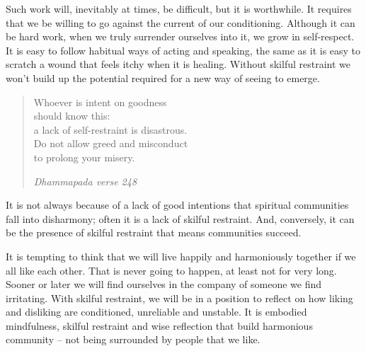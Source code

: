 Such work will, inevitably at times, be difficult, but it is worthwhile.
It requires that we be willing to go against the current of our
conditioning. Although it can be hard work, when we truly surrender
ourselves into it, we grow in self-respect. It is easy to follow
habitual ways of acting and speaking, the same as it is easy to scratch
a wound that feels itchy when it is healing. Without skilful restraint
we won't build up the potential required for a new way of seeing to
emerge.

\begin{quote}
  Whoever is intent on goodness\\
  should know this:\\
  a lack of self-restraint is disastrous.\\
  Do not allow greed and misconduct\\
  to prolong your misery.

  \emph{Dhammapada verse 248}
\end{quote}

It is not always because of a lack of good intentions that spiritual
communities fall into disharmony; often it is a lack of skilful
restraint. And, conversely, it can be the presence of skilful restraint
that means communities succeed.

It is tempting to think that we will live happily and harmoniously
together if we all like each other. That is never going to happen, at
least not for very long. Sooner or later we will find ourselves in the
company of someone we find irritating. With skilful restraint, we will
be in a position to reflect on how liking and disliking are conditioned,
unreliable and unstable. It is embodied mindfulness, skilful restraint
and wise reflection that build harmonious community -- not being
surrounded by people that we like.

